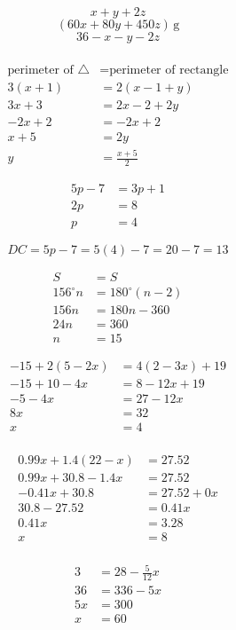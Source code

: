 \documentclass{article}
\begin{document}
\newpage
\[x+y+2z\]
\[(60x+80y+450z)\,\mathrm{g}\]
\[36-x-y-2z\]
\\
\[\begin{aligned}
    \text{perimeter of }\triangle&=\text{perimeter of rectangle}\\
    3(x+1)&=2(x-1+y)\\
    3x+3&=2x-2+2y\\
    -2x+2&=-2x+2\\
    \hline
    x+5&=2y\\
    y&=\boxed{\frac{x+5}2}
\end{aligned}\]

\[\begin{aligned}
    5p-7&=3p+1\\
    2p&=8\\
    p&=4
\end{aligned}\]

\[DC=5p-7=5(4)-7=20-7=13\]

\[\begin{aligned}
    S&=S\\
    156^\circ n&=180^\circ(n-2)\\
    156n&=180n-360\\
    24n&=360\\
    n&=15
\end{aligned}\]

\newpage

\[\begin{aligned}
    -15+2(5-2x)&=4(2-3x)+19\\
    -15+10-4x&=8-12x+19\\
    -5-4x&=27-12x\\
    8x&=32\\
    x&=\boxed4\\
\end{aligned}\]

\[\begin{aligned}
    0.99x+1.4(22-x)&=27.52\\
    0.99x+30.8-1.4x&=27.52\\
    -0.41x+30.8&=27.52+0x\\
    30.8-27.52&=0.41x\\
    0.41x&=3.28\\
    x&=\boxed8\\
\end{aligned}\]

\[\begin{aligned}
    3&=28-\frac5{12}x\\
    36&=336-5x\\
    5x&=300\\
    x&=\boxed{60}
\end{aligned}\]
\end{document}
